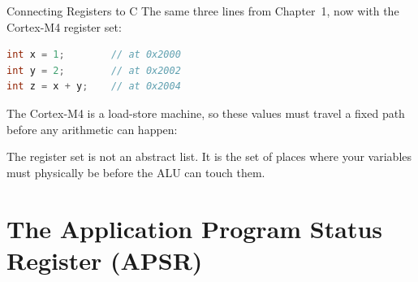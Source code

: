 \documentclass[9pt,aspectratio=169,xcolor=table]{beamer}
\begin{document}
\begin{frame}[fragile]{Connecting Registers to C}
    The same three lines from Chapter~1, now with the Cortex-M4 register set:

    \vspace{2mm}
    \begin{center}
    \begin{minipage}{.4\textwidth}
\begin{lstlisting}[language=C, basicstyle=\ttfamily\normalsize]
int x = 1;        // at 0x2000
int y = 2;        // at 0x2002
int z = x + y;    // at 0x2004
\end{lstlisting}
    \end{minipage}
    \end{center}

    \vspace{1mm}
    The Cortex-M4 is a load-store machine, so these values must travel a
    fixed path before any arithmetic can happen:

    \vspace{0mm}
    \begin{center}
    \end{center}

    \vspace{2mm}
    {\small The register set is not an abstract list. It is the set
    of places where your variables must \alert{physically be} before
    the ALU can touch them.}
\end{frame}

\section{The Application Program Status Register (APSR)}
\end{document}

